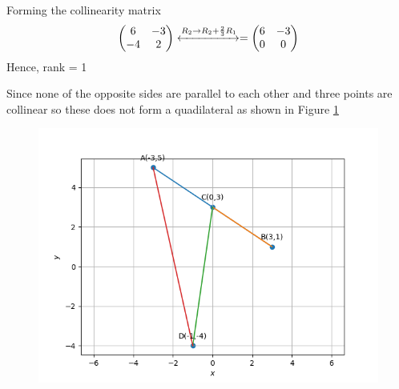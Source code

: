 \documentclass[12pt]{article}
\newcommand{\myvec}[1]{\ensuremath{\begin{pmatrix}#1\end{pmatrix}}}
\begin{document}
\begin{enumerate}
	Forming the collinearity matrix
	\begin{align}
		\myvec{6&-3\\-4&2} \xleftrightarrow{R_{2}\rightarrow R_{2}+\frac{2}{3}R_{1}}= \myvec{6&-3\\0&0}
	\end{align}
	Hence, rank = 1

	Since none of the opposite sides are parallel to each other and three points are collinear so these does not form a quadilateral as shown in Figure \ref{fig:Fig2}
	
\begin{figure}[!h]
	\begin{center} 
	    \includegraphics[width=\columnwidth]{figs/quad2}
	\end{center}
\caption{}
\label{fig:Fig2}
\end{figure}
	

\end{enumerate}
\end{document}
